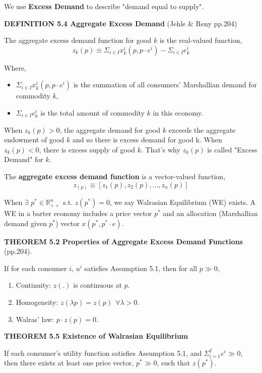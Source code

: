 \documentclass{article}
\newcommand{\R}{\mathbb{R}}
\begin{document}
\begin{mdframed}[backgroundcolor=blue!20,linecolor=white]
We use \textbf{Excess Demand} to describe "demand equal to supply".
\vspace{2mm}

\textbf{DEFINITION 5.4 Aggregate Excess Demand} (Jehle \& Reny pp.204)

The aggregate excess demand function for good $k$ is the real-valued function,
$$z_k(p) \equiv \Sigma_{i \in I } x^i_k(p,p\cdot e^i) - \Sigma_{i \in I } e^i_k$$

Where,
\begin{itemize}
\item $\Sigma_{i \in I } x^i_k(p,p\cdot e^i)$ is the summation of all consumers' Marshallian demand for commodity $k$,
\item $\Sigma_{i \in I } e^i_k$ is the total amount of commodity $k$ in this economy.
\end{itemize}

When $z_k(p) > 0$, the aggregate demand for good $k$ exceeds the aggregate endowment of good $k$ and so there is excess demand for good k. When $z_k(p) < 0$, there is excess supply of good $k$. That's why $z_k(p)$ is called "Excess Demand" for $k$.
\vspace{2mm}

The \textbf{aggregate excess demand function} is a vector-valued function,
$$z_(p) \equiv [z_1(p),z_2(p),\dots,z_n(p)]$$

\vspace{2mm}


When $\exists$ $p^* \in \R^n_{++}$ s.t. $z(p^*) = 0$, we say
Walrasian Equilibrium (WE) exists. A WE in a barter economy includes a price vector $p^*$ and an allocation (Marshallian demand given $p^*$) vector $x(p^*,p^*\cdot e)$.

\vspace{4mm}

\textbf{THEOREM 5.2 Properties of Aggregate Excess Demand Functions} (pp.204).

If for each consumer $i$, $u^i$ satisfies Assumption 5.1, then for all $p \gg 0$,


\begin{enumerate}
\item Continuity: $z(.)$ is continuous at $p$.
\item Homogeneity: $z(\lambda p) = z(p) \ \ \forall \lambda > 0$.
\item Walras' law: $p \cdot z(p) = 0$.
\end{enumerate}

\vspace{4mm}

\textbf{THEOREM 5.5 Existence of Walrasian Equilibrium}

If each consumer's utility function satisfies Assumption 5.1, and
$\Sigma_{i=1}^{I} e^i \gg 0$, then there exists at least one price vector, $p^* \gg 0$, such that $z(p^*)$.


\end{mdframed}
\end{document}
